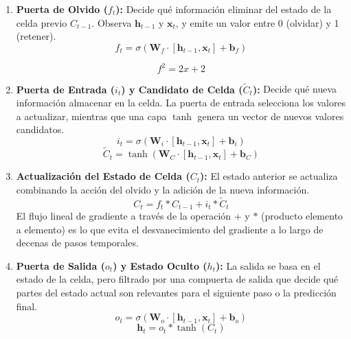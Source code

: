 \documentclass[titlepage,11pt]{report}
\begin{document}
\begin{enumerate}
    \item \textbf{Puerta de Olvido (\(f_t\)):} Decide qué información eliminar del estado de la celda previo \(C_{t-1}\). Observa \(\mathbf{h}_{t-1}\) y \(\mathbf{x}_t\), y emite un valor entre 0 (olvidar) y 1 (retener).
    \begin{equation}
        f_t = \sigma(\mathbf{W}_f \cdot [\mathbf{h}_{t-1}, \mathbf{x}_t] + \mathbf{b}_f)
    \end{equation}

    \begin{equation*}
      f^2=2x+2
    \end{equation*}
    
    \item \textbf{Puerta de Entrada (\(i_t\)) y Candidato de Celda (\(\tilde{C}_t\)):} Decide qué nueva información almacenar en la celda. La puerta de entrada selecciona los valores a actualizar, mientras que una capa \(\tanh\) genera un vector de nuevos valores candidatos.
    \begin{equation}
        i_t = \sigma(\mathbf{W}_i \cdot [\mathbf{h}_{t-1}, \mathbf{x}_t] + \mathbf{b}_i)
    \end{equation}
    \begin{equation}
        \tilde{C}_t = \tanh(\mathbf{W}_C \cdot [\mathbf{h}_{t-1}, \mathbf{x}_t] + \mathbf{b}_C)
    \end{equation}
    
    \item \textbf{Actualización del Estado de Celda (\(C_t\)):} El estado anterior se actualiza combinando la acción del olvido y la adición de la nueva información.
    \begin{equation}
        C_t = f_t * C_{t-1} + i_t * \tilde{C}_t
    \end{equation}
    El flujo lineal de gradiente a través de la operación \(+\) y \(*\) (producto elemento a elemento) es lo que evita el desvanecimiento del gradiente a lo largo de decenas de pasos temporales.

    \item \textbf{Puerta de Salida (\(o_t\)) y Estado Oculto (\(h_t\)):} La salida se basa en el estado de la celda, pero filtrado por una compuerta de salida que decide qué partes del estado actual son relevantes para el siguiente paso o la predicción final.
    \begin{equation}
        o_t = \sigma(\mathbf{W}_o \cdot [\mathbf{h}_{t-1}, \mathbf{x}_t] + \mathbf{b}_o)
    \end{equation}
    \begin{equation}
        \mathbf{h}_t = o_t * \tanh(C_t)
    \end{equation}
\end{enumerate}
\end{document}
